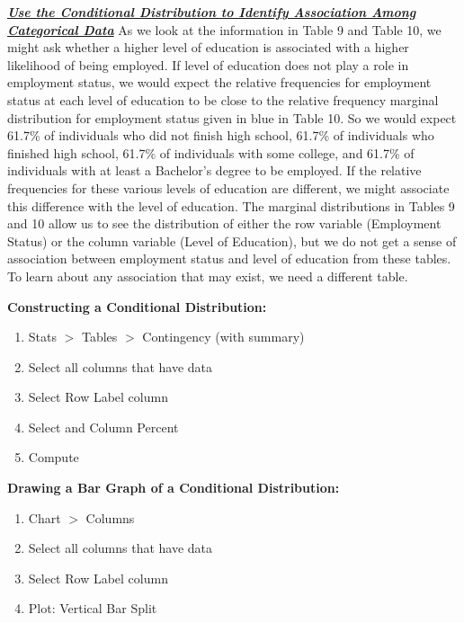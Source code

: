 \documentclass{report}
\begin{document}
    \pagebreak \bigbreak \noindent
    \textbf{\textit{\underline{Use the Conditional Distribution to Identify Association Among Categorical Data}}}
    \bigbreak \noindent 
    As we look at the information in Table 9 and Table 10, we might ask whether a higher level of education is associated with a higher likelihood of being employed.
    \bigbreak \noindent 
    If level of education does not play a role in employment status, we would expect the relative frequencies for employment status at each level of education to be close to the relative frequency marginal distribution for employment status given in blue in Table 10. So we would expect 61.7\% of individuals who did not finish high school, 61.7\% of individuals who finished high school, 61.7\% of individuals with some college, and 61.7\% of individuals with at least a Bachelor's degree to be employed. If the relative frequencies for these various levels of education are different, we might associate this difference with the level of education.
    \bigbreak \noindent 
    The marginal distributions in Tables 9 and 10 allow us to see the distribution of either the row variable (Employment Status) or the column variable (Level of Education), but we do not get a sense of association between employment status and level of education from these tables.
    \bigbreak \noindent 
    To learn about any association that may exist, we need a different table.

    \bigbreak \noindent \bigbreak \noindent 
    \textbf{Constructing a Conditional Distribution:}
    \bigbreak \noindent 
    \begin{enumerate}
        \item Stats $> $ Tables $>  $ Contingency (with summary)
        \item Select all columns that have data
        \item Select Row Label column
        \item Select and Column Percent
        \item Compute
    \end{enumerate}

    \bigbreak \noindent \bigbreak \noindent 
    \textbf{Drawing a Bar Graph of a Conditional Distribution:}
    \bigbreak \noindent 
    \begin{enumerate}
        \item Chart $> $ Columns 
        \item Select all columns that have data
        \item Select Row Label column
        \item Plot: Vertical Bar Split
    \end{enumerate}
\end{document}

